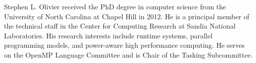\begin{IEEEbiography}{Stephen L. Olivier}
received the PhD degree in computer science from the
University of North Carolina at Chapel Hill in 2012. 
He is a principal member of the technical staff in 
the Center for Computing Research at Sandia National 
Laboratories. His research interests include runtime 
systems, parallel programming models, and power-aware 
high performance computing. 
He serves on the OpenMP Language Committee and is 
 Chair of the Tasking Subcommittee.
\end{IEEEbiography}

